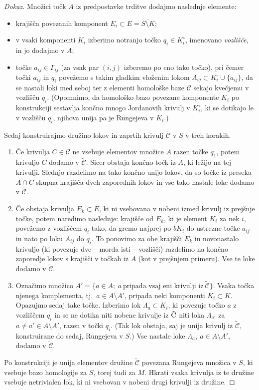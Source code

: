 \documentclass[12pt,a4paper,twoside]{article}
\theoremstyle{definition} %
\newenvironment{dokaz}[1][Dokaz]{\begin{proof}[#1]}{\end{proof}}
\theoremstyle{plain} %
\numberwithin{equation}{section}  %
\begin{document}
\begin{dokaz}
Množici točk $A$ iz predpostavke trditve dodajmo naslednje elemente:
\begin{itemize}
\item krajišča povezanih komponent $E_{i} \subset E = \overline{S \setminus K}$;
\item v vsaki komponenti $K_{i}$ izberimo notranjo točko $q_{i} \in K_{i}^{\circ}$, imenovano \emph{vozlišče}, in jo dodajmo v $A$;
\item točke $a_{ij} \in \Gamma_{ij}$ (za vsak par $(i,j)$ izberemo po eno tako točko), pri čemer točki $a_{ij}$ in $q_{i}$ povežemo s takim gladkim vloženim lokom $A_{ij} \subset K_{i}^{\circ} \cup \{a_{ij}\}$, da se nastali loki med seboj ter z elementi homološke baze $\mathcal{C}$ sekajo kvečjemu v vozlišču $q_{i}$. (Opomnimo, da homološko bazo povezane komponente $K_{i}$ po konstrukciji sestavlja končno mnogo Jordanovih krivulj v $K_{i}^{\circ}$, ki se dotikajo le v vozlišču $q_{i}$, njihova unija pa je Rungejeva v $K_{i}$.)
\end{itemize}
Sedaj konstruirajmo družino lokov in zaprtih krivulj $\tilde{\mathcal{C}}$ v $S$ v treh korakih.
\begin{enumerate}
\item
	Če krivulja $C \in \mathcal{C}$ ne vsebuje elementov množice $A$ razen točke $q_{1}$, potem krivuljo $C$ dodamo v $\tilde{\mathcal{C}}$.
	Sicer obstaja končno točk iz $A$, ki ležijo na tej krivulji. Slednjo razdelimo na tako končno unijo lokov, da so točke iz preseka $A \cap C$ skupna krajišča dveh zaporednih lokov in vse tako nastale loke dodamo v $\tilde{\mathcal{C}}$.
\item
	Če obstaja krivulja $E_{k} \subset E$, ki ni vsebovana v nobeni izmed krivulj iz prejšnje točke, potem naredimo naslednje:
	krajišče od $E_{k}$, ki je element $K_{i}$ za nek $i$, povežemo z vozliščem $q_{i}$ tako, da gremo najprej po $bK_{i}$ do ustrezne točke $a_{ij}$ in nato po loku $A_{ij}$ do $q_{i}$. To ponovimo za obe krajišči $E_{k}$ in novonastalo krivuljo (ki povezuje dve -- morda isti -- vozlišči) razdelimo na končno zaporedje lokov s krajišči v točkah iz $A$ (kot v prejšnjem primeru). Vse te loke dodamo v $\tilde{\mathcal{C}}$.
\item
	Označimo množico $A' = \{ a \in A; \ a \ \textrm{pripada vsaj eni krivulji iz} \ \tilde{\mathcal{C}}\}$.
	Vsaka točka njenega komplementa, tj.~$a \in A \setminus A'$, pripada neki komponenti $K_{i} \subset K$. Opazujmo sedaj take točke.
	Izberimo lok $\Lambda_{a} \subset K_{i}$, ki povezuje točko $a$ z vozliščem $q_{i}$ in se ne dotika niti nobene krivulje iz $\tilde{\textup{C}}$ niti loka $\Lambda_{a'}$ za $a \neq a' \in A \setminus A'$, razen v točki $q_{i}$. (Tak lok obstaja, saj je unija krivulj iz $\tilde{\mathcal{C}}$, konstruirane do sedaj, Rungejeva v $S$.) Vse nastale loke $\Lambda_{a}, \ a \in A \setminus A'$, dodamo v $\tilde{\mathcal{C}}$.
\end{enumerate}
Po konstrukciji je unija elementov družine $\tilde{\mathcal{C}}$ povezana Rungejeva množica v $S$, ki vsebuje bazo homologije za $S$, torej tudi za $M$. Hkrati vsaka krivulja iz te družine vsebuje netrivialen lok, ki ni vsebovan v nobeni drugi krivulji iz družine. \newline


\end{dokaz}
\end{document}
